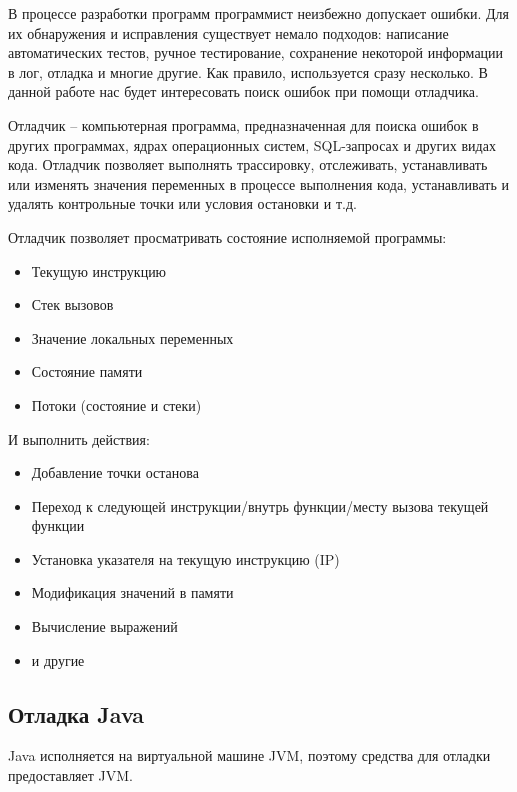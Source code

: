 В процессе разработки программ программист неизбежно допускает ошибки. Для их обнаружения и исправления существует немало подходов: написание автоматических тестов, ручное тестирование, сохранение некоторой информации в лог, отладка и многие другие. Как правило, используется сразу несколько. В данной работе нас будет интересовать поиск ошибок при помощи отладчика.

\begin{definition}\label{debugger:definition}
	Отладчик --  компьютерная программа, предназначенная для поиска ошибок в других программах, ядрах операционных систем, SQL-запросах и других видах кода. Отладчик позволяет выполнять трассировку, отслеживать, устанавливать или изменять значения переменных в процессе выполнения кода, устанавливать и удалять контрольные точки или условия остановки и т.д.\cite{wiki:debugger}
\end{definition}

\noindent Отладчик позволяет просматривать состояние исполняемой программы:

\begin{itemize}
	\item Текущую инструкцию
	\item Стек вызовов
	\item Значение локальных переменных
	\item Состояние памяти
	\item Потоки (состояние и стеки)
\end{itemize}

\noindent И выполнить действия:

\begin{itemize}
	\item Добавление точки останова
	\item Переход к следующей инструкции/внутрь функции/месту вызова текущей функции
	\item Установка указателя на текущую инструкцию (IP)
	\item Модификация значений в памяти
	\item Вычисление выражений
	\item и другие
\end{itemize}

\subsection{Отладка Java}

Java исполняется на виртуальной машине JVM, поэтому средства для отладки предоставляет 
JVM.

